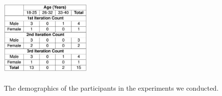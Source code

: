 \documentclass{sigchi-ext}
\begin{document}
\begin{marginfigure}[0pc]
\begin{minipage}{\marginparwidth}
     \includegraphics[width=4.5cm,height=4cm]{figures/demographic.png}
    \caption{The demographics of the participants in the experiments we conducted.}
    \label{fig:demographic}
    \end{minipage}
\end{marginfigure}
\end{document}
